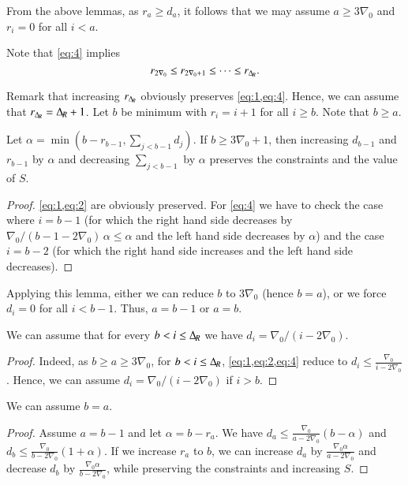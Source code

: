 From the above lemmas, as $r_a\geq d_a$, it follows that we may assume $a\ge 3\nabla_0 $ and $r_i=0$ for all $i<a$.


Note that \cref{eq:4} implies
\begin{equation}
	r_{2\nabla_0 }\le r_{2\nabla_0 +1}\le \dots\le r_{\Delta_{\hspace{-1pt}R}}.
\end{equation}

Remark that increasing $r_{\Delta_{\hspace{-1pt}R}}$ obviously preserves \cref{eq:1,eq:4}. Hence, we can assume that $r_{\Delta_{\hspace{-1pt}R}}={\Delta_{\hspace{-1pt}R}}+1$.
Let $b$ be minimum with $r_{i}=i+1$ for all $i\geq b$. Note that $b\ge a$.


\begin{lemma}
	Let $\alpha=\min(b-r_{b-1},\sum_{j<b-1}d_j)$.
If $b\ge 3\nabla_0 +1$, then increasing  $d_{b-1}$ and $r_{b-1}$ by $\alpha$ and decreasing
$\sum_{j<b-1}$ by $\alpha$ preserves the constraints and the value of $S$.
\end{lemma}
\begin{proof}
	\cref{eq:1,eq:2} are obviously preserved. For \cref{eq:4} we have to check the case where $i=b-1$ (for which the right hand side decreases by $\nabla_0 /(b-1-2\nabla_0 )\,\alpha\le\alpha$ and the left hand side decreases by $\alpha$) and the case $i=b-2$  (for which the right hand side increases and the left hand side decreases).
\end{proof}
Applying this lemma, either we can reduce $b$ to $3\nabla_0 $ (hence $b=a$), or we force $d_i=0$ for all $i<b-1$. Thus, $a=b-1$ or $a=b$.

\begin{lemma}
	We can assume that for every $b< i\le {\Delta_{\hspace{-1pt}R}}$ we have  $d_i=\nabla_0 /(i-2\nabla_0 )$.
\end{lemma}
\begin{proof}
Indeed, as $b\ge a\ge 3\nabla_0 $, for $b< i\le {\Delta_{\hspace{-1pt}R}}$,  \cref{eq:1,eq:2,eq:4} reduce to
$d_{i}\le \frac{\nabla_0 }{i-2\nabla_0 }$. Hence, we can assume $d_i=\nabla_0 /(i-2\nabla_0 )$ if $i> b$.
\end{proof}

\begin{lemma}
	We can assume $b=a$.
\end{lemma}
\begin{proof}
	Assume $a=b-1$ and let $\alpha=b-r_a$.
	We have $d_a\le\frac{\nabla_0 }{a-2\nabla_0 } (b-\alpha)$ and $d_b\le \frac{\nabla_0 }{b-2\nabla_0 } (1+\alpha)$.
	If we increase $r_a$ to $b$, we can increase $d_a$ by $\frac{\nabla_0 \alpha}{a-2\nabla_0 }$ and decrease
	$d_b$ by  $\frac{\nabla_0 \alpha}{b-2\nabla_0 }$, while preserving the constraints and increasing $S$.
\end{proof}

